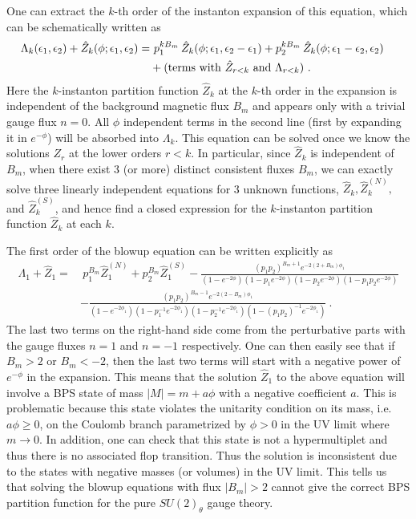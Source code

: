 One can extract the $k$-th order of the instanton expansion of this equation, which can be schematically written as
\begin{align}
\Lambda_k(\epsilon_1,\epsilon_2) + \hat{Z}_k(\phi; \epsilon_1, \epsilon_2)
=& ~p_1^{kB_m}\, \hat{Z}_k(\phi; \epsilon_1, \epsilon_2 - \epsilon_1) + p_2^{kB_m}\, \hat{Z}_k(\phi; \epsilon_1 - \epsilon_2, \epsilon_2) \cr
&+ (\text{terms with } \hat{Z}_{r<k} \ \text{and } \Lambda_{r<k})\ .
\end{align}
Here the $k$-instanton partition function $\hat{Z}_k$ at the $k$-th order in the expansion is independent of the background magnetic flux $B_m$ and appears only with a trivial gauge flux $n=0$.
All $\phi$ independent terms in the second line (first by expanding it in $e^{-\phi}$) will be absorbed into $\Lambda_k$. This equation can be solved once we know the solutions $Z_{r}$ at the lower orders $r<k$. In particular, since $\hat{Z}_k$ is independent of $B_m$, when there exist 3 (or more) distinct consistent fluxes $B_m$, we can exactly solve three linearly independent equations for 3 unknown functions, $\hat{Z}_k,\hat{Z}_k^{(N)},$ and $\hat{Z}^{(S)}_k$, and hence find a closed expression for the $k$-instanton partition function $\hat{Z}_k$ at each $k$.

The first order of the blowup equation can be written explicitly as
\begin{align}\label{eq:1-inst-su2}
	\Lambda_1+\hat{Z}_1 =& \  p_1^{B_m}\hat{Z}_1^{(N)}+p_2^{B_m}\hat{Z}_1^{(S)} - \frac{(p_1p_2)^{B_m+1}e^{-2(2+B_m)\phi_1}}{(1-e^{-2\phi})(1-p_1e^{-2\phi})(1-p_2e^{-2\phi})(1-p_1p_2e^{-2\phi})} \nonumber \\
	&- \frac{(p_1p_2)^{B_m-1}e^{-2(2-B_m)\phi_1}}{(1-e^{-2\phi_1})(1-p_1^{-1}e^{-2\phi_1})(1-p_2^{-1}e^{-2\phi_1})(1-(p_1p_2)^{-1}e^{-2\phi_1})} \ .
\end{align}
The last two terms on the right-hand side come from the perturbative parts with the gauge fluxes $n=1$ and $n=-1$ respectively. One can then easily see that if $B_m>2$ or $B_m<-2$, then the last two terms will start with a negative power of $e^{-\phi}$ in the expansion. This means that the solution $\hat{Z}_1$ to the above equation will involve a BPS state of mass $|M|=m+ a \phi$ with a negative coefficient $a$. This is problematic because this state violates the unitarity condition on its mass, i.e. $a\phi\ge0$, on the Coulomb branch parametrized by $\phi>0$ in the UV limit where $m\rightarrow0$. In addition, one can check that this state is not a hypermultiplet and thus there is no associated flop transition. Thus the solution is inconsistent due to the states with  negative masses (or volumes) in the UV limit. This tells us that solving the blowup equations with flux $|B_m|>2$ cannot give the correct BPS partition function for the pure $SU(2)_\theta$ gauge theory.

